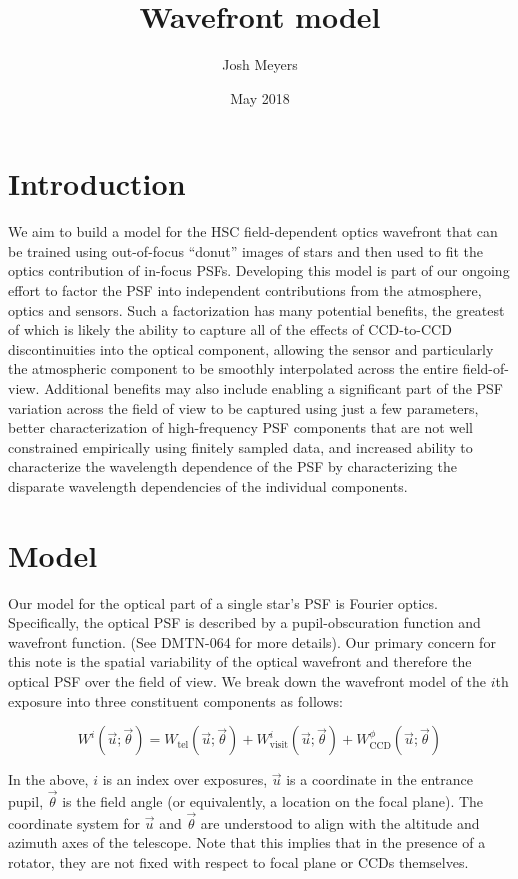 \documentclass{article}
\title{Wavefront model}
\author{Josh Meyers}
\date{May 2018}
\begin{document}
\section{Introduction}

We aim to build a model for the HSC field-dependent optics wavefront that can be
trained using out-of-focus ``donut'' images of stars and then used to fit the
optics contribution of in-focus PSFs.  Developing this model is part of our
ongoing effort to factor the PSF into independent contributions from the
atmosphere, optics and sensors.  Such a factorization has many potential
benefits, the greatest of which is likely the ability to capture all of the
effects of CCD-to-CCD discontinuities into the optical component, allowing the
sensor and particularly the atmospheric component to be smoothly interpolated
across the entire field-of-view.  Additional benefits may also include enabling
a significant part of the PSF variation across the field of view to be captured
using just a few parameters, better characterization of high-frequency PSF
components that are not well constrained empirically using finitely sampled
data, and increased ability to characterize the wavelength dependence of the PSF
by characterizing the disparate wavelength dependencies of the individual
components.

\section{Model}

Our model for the optical part of a single star's PSF is Fourier optics.
Specifically, the optical PSF is described by a pupil-obscuration function and
wavefront function. (See DMTN-064 for more details).  Our primary concern for
this note is the spatial variability of the optical wavefront and therefore the
optical PSF over the field of view.  We break down the wavefront model of the
$i$th exposure into three constituent components as follows:

\begin{equation}
    W^i\left(\vec{u}; \vec{\theta}\right) =
    W_\mathrm{tel}\left(\vec{u}; \vec{\theta}\right) +
    W_\mathrm{visit}^i\left(\vec{u}; \vec{\theta}\right) +
    W_\mathrm{CCD}^\phi\left(\vec{u}; \vec{\theta}\right)
\end{equation}

In the above, $i$ is an index over exposures, $\vec{u}$ is a coordinate in the
entrance pupil, $\vec{\theta}$ is the field angle (or equivalently, a location
on the focal plane).  The coordinate system for $\vec{u}$ and $\vec{\theta}$ are
understood to align with the altitude and azimuth axes of the telescope. Note
that this implies that in the presence of a rotator, they are not fixed with
respect to focal plane or CCDs themselves.
\end{document}
